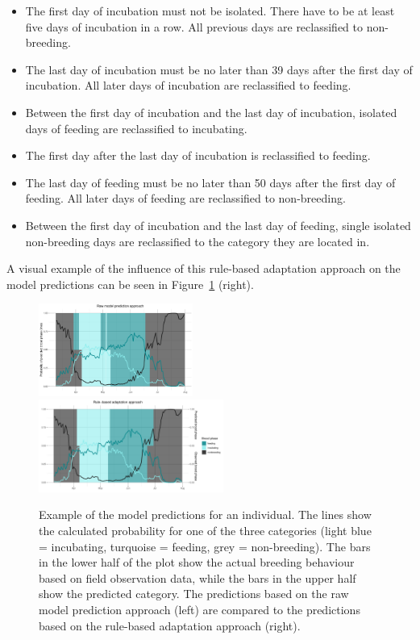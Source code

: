 \begin{itemize}
    \item The first day of incubation must not be isolated. There have to be at least five days of incubation in a row. All previous days are reclassified to non-breeding.
    \item The last day of incubation must be no later than 39 days after the first day of incubation. All later days of incubation are reclassified to feeding.
    \item Between the first day of incubation and the last day of incubation, isolated days of feeding are reclassified to incubating.
    \item The first day after the last day of incubation is reclassified to feeding.
    \item The last day of feeding must be no later than 50 days after the first day of feeding. All later days of feeding are reclassified to non-breeding.
    \item Between the first day of incubation and the last day of feeding, single isolated non-breeding days are reclassified to the category they are located in.
\end{itemize}

\noindent A visual example of the influence of this rule-based adaptation approach on the model predictions can be seen in Figure~\ref{figure:example_prediction} (right).

\begin{figure}[H]
\centering
\includegraphics[width=0.45\textwidth]{figures/methods/07_prediction_example_raw.pdf}
\includegraphics[width=0.54\textwidth]{figures/methods/08_prediction_example_rule.pdf}
\caption[Example of an MLRM prediction]{Example of the model predictions for an individual. The lines show the calculated probability for one of the three categories (light blue = incubating, turquoise = feeding, grey = non-breeding). The bars in the lower half of the plot show the actual breeding behaviour based on field observation data, while the bars in the upper half show the predicted category. The predictions based on the raw model prediction approach (left) are compared to the predictions based on the rule-based adaptation approach (right).}
\label{figure:example_prediction}
\end{figure}



